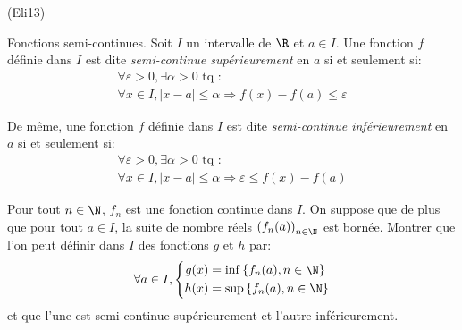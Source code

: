 \begin{tiny}(Eli13)\end{tiny} Fonctions semi-continues.\newline
Soit $I$ un intervalle de $\R$ et $a\in I$. Une fonction $f$ définie dans $I$ est dite \emph{semi-continue supérieurement} en $a$ si et seulement si:
\begin{multline*}
\forall \varepsilon >0, \exists \alpha >0 \text{ tq }:\\
\forall x\in I, \left|x-a\right| \leq \alpha \Rightarrow f(x) - f(a) \leq \varepsilon
\end{multline*}

De même, une fonction $f$ définie dans $I$ est dite \emph{semi-continue inférieurement} en $a$ si et seulement si:
\begin{multline*}
\forall \varepsilon >0, \exists \alpha >0 \text{ tq }:\\
\forall x\in I, \left|x-a\right| \leq \alpha \Rightarrow \varepsilon \leq f(x) - f(a)
\end{multline*}

Pour tout $n\in \N$, $f_n$ est une fonction continue dans $I$. On suppose que de plus que pour tout $a\in I$, la suite de nombre réels $\left( f_n(a)\right)_{n\in \N}$ est bornée.\newline
Montrer que l'on peut définir dans $I$ des fonctions $g$ et $h$ par:
\begin{displaymath}
\forall a\in I,
\left\lbrace 
\begin{aligned}
  g(x) &= \inf\left\lbrace f_n(a), n\in \N\right\rbrace \\
  h(x) &= \sup\left\lbrace f_n(a), n\in \N\right\rbrace
\end{aligned}
\right. 
\end{displaymath}
et que l'une est semi-continue supérieurement et l'autre inférieurement.
